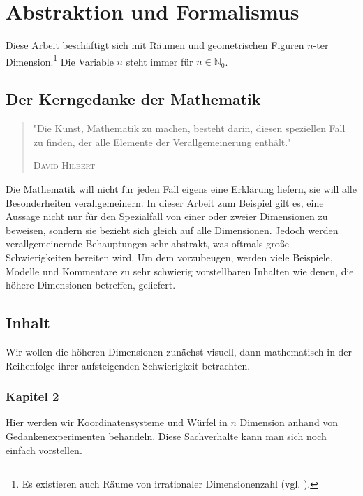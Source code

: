 \chapter{Abstraktion und Formalismus}
\label{sec:AuF}
Diese Arbeit beschäftigt sich mit Räumen und geometrischen Figuren $n$-ter Dimension.\footnote{Es existieren auch Räume von irrationaler Dimensionenzahl (vgl. \cite{Fraktale}).} Die Variable $n$ steht immer für $n\in \mathbb{N}_0$.
\section{Der Kerngedanke der Mathematik}
\begin{quote}
"Die Kunst, Mathematik zu machen, besteht darin, diesen speziellen Fall zu finden, der alle Elemente der Verallgemeinerung enthält."
\begin{flushright}
\textsc{David Hilbert}
\end{flushright}
\end{quote}

Die Mathematik will nicht für jeden Fall eigens eine Erklärung liefern, sie will alle Besonderheiten verallgemeinern. In dieser Arbeit zum Beispiel gilt es, eine Aussage nicht nur für den Spezialfall von einer oder zweier Dimensionen zu beweisen, sondern sie bezieht sich gleich auf alle Dimensionen. 
Jedoch werden verallgemeinernde Behauptungen sehr abstrakt, was oftmals große Schwierigkeiten bereiten wird. Um dem vorzubeugen, werden viele Beispiele, Modelle und Kommentare zu sehr schwierig vorstellbaren Inhalten wie denen, die höhere Dimensionen betreffen, geliefert.
\newpage
\section{Inhalt}
 Wir wollen die höheren Dimensionen zunächst visuell, dann mathematisch in der Reihenfolge ihrer aufsteigenden Schwierigkeit betrachten. 
\subsection*{Kapitel 2}
Hier werden wir Koordinatensysteme und Würfel in $n$ Dimension anhand von Gedankenexperimenten behandeln. Diese Sachverhalte kann man sich noch einfach vorstellen.
